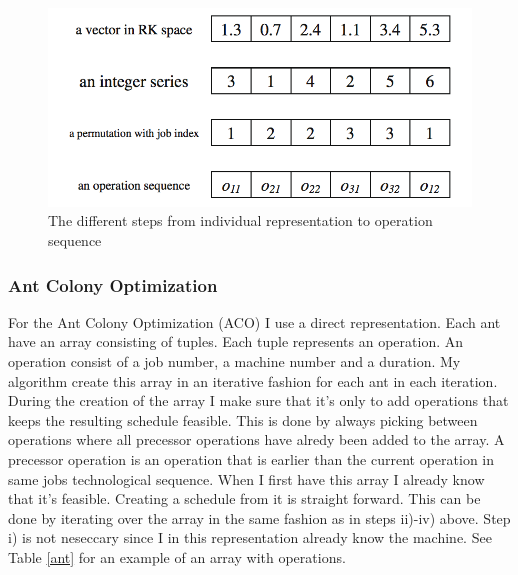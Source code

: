 \documentclass{article}
\begin{document}
\begin{figure}[h!]
  \centering
  \includegraphics[scale=.4]{repr.png}
  \caption{The different steps from individual representation to operation sequence}
  \label{fig:repr}
\end{figure}

\pagebreak
\subsubsection*{Ant Colony Optimization}
For the Ant Colony Optimization (ACO) I use a direct representation. Each ant have an array consisting of tuples. Each tuple represents an operation. An operation consist of a job number, a machine number and a duration.
My algorithm create this array in an iterative fashion for each ant in each iteration. During the creation of the array I make sure that it's only to add operations that keeps the resulting schedule feasible. This is done by always picking between
operations where all precessor operations have alredy been added to the array. A precessor operation is an operation that is earlier than the current operation in same jobs technological sequence. When I first have this array I already know that it's
feasible. Creating a schedule from it is straight forward. This can be done by iterating over the array in the same fashion as in steps ii)-iv) above. Step i) is not neseccary since I in this representation already know the machine. See Table \ref{ant} for an 
example of an array with operations.
\end{document}
